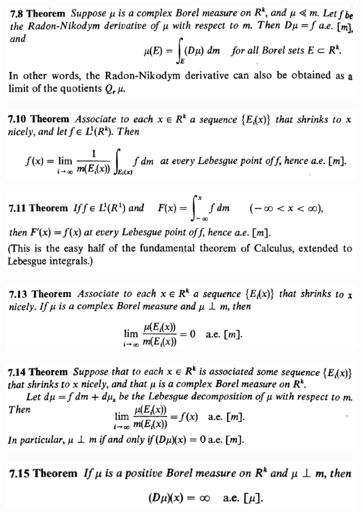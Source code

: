 \documentclass[12pt]{article}
\begin{document}
		\begin{center}
		\includegraphics{7ponto8}
		\end{center}

		\begin{center}
		\includegraphics{7ponto10}
		\end{center}

		\begin{center}
		\includegraphics{7ponto11}
		\end{center}

		\begin{center}
		\includegraphics{7ponto13}
		\end{center}

		\begin{center}
		\includegraphics{7ponto14}
		\end{center}

		\begin{center}
		\includegraphics{7ponto15}
		\end{center}
\end{document}
